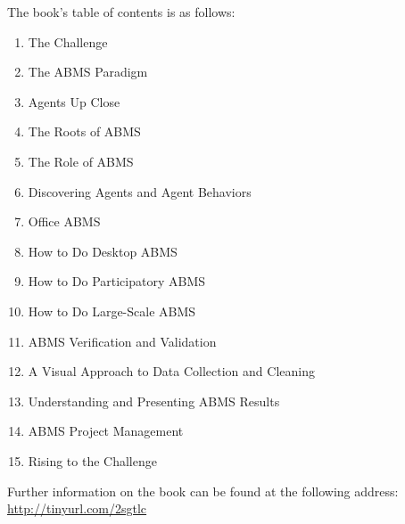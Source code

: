 \documentclass[11pt]{article}
\begin{document}
The book's table of contents is as follows:
\begin{enumerate}
\item The Challenge 
\item The ABMS Paradigm
\item Agents Up Close 
\item The Roots of ABMS 
\item The Role of ABMS 
\item Discovering Agents and Agent Behaviors 
\item Office ABMS 
\item How to Do Desktop ABMS 
\item How to Do Participatory ABMS
\item How to Do Large-Scale ABMS 
\item ABMS Verification and Validation 
\item A Visual Approach to Data Collection and Cleaning 
\item Understanding and Presenting ABMS Results 
\item ABMS Project Management 
\item Rising to the Challenge
\end{enumerate}

Further information on the book can be found at the following address:
\url{http://tinyurl.com/2sgtlc}
\end{document}
